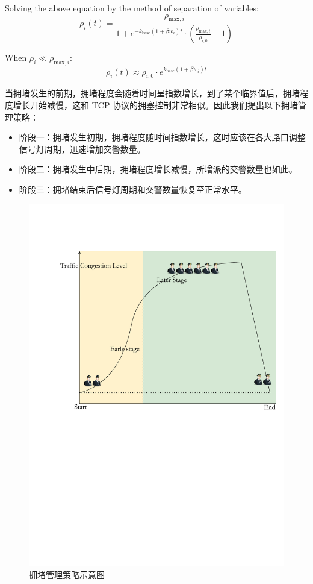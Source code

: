 \documentclass[12pt, a4paper, oneside]{ctexart}
\begin{document}
Solving the above equation by the method of separation of variables:
\begin{equation}
\rho_i(t) = \frac{\rho_{\text{max},i}}{1 + e^{-k_{\text{base}} (1 + \beta w_i) t} \cdot \left( \frac{\rho_{\text{max},i}}{\rho_{i,0}} - 1 \right)}
\end{equation}

When $\rho_i \ll \rho_{\text{max},i}$:
\begin{equation}
\rho_i(t) \approx \rho_{i,0} \cdot e^{k_{\text{base}} (1 + \beta w_i) t}
\end{equation}

当拥堵发生的前期，拥堵程度会随着时间呈指数增长，到了某个临界值后，拥堵程度增长开始减慢，这和 TCP 协议的拥塞控制\cite{Jacobson1988}非常相似。因此我们提出以下拥堵管理策略：

\begin{itemize}
    \item 阶段一：拥堵发生初期，拥堵程度随时间指数增长，这时应该在各大路口调整信号灯周期，迅速增加交警数量。
    \item 阶段二：拥堵发生中后期，拥堵程度增长减慢，所增派的交警数量也如此。
    \item 阶段三：拥堵结束后信号灯周期和交警数量恢复至正常水平。
\end{itemize}

\begin{figure}[H]
  \centering
  \includegraphics[width=\textwidth]{figures/3stage.pdf}
  \caption{拥堵管理策略示意图}
  \label{fig:3stage}
\end{figure}
\end{document}
